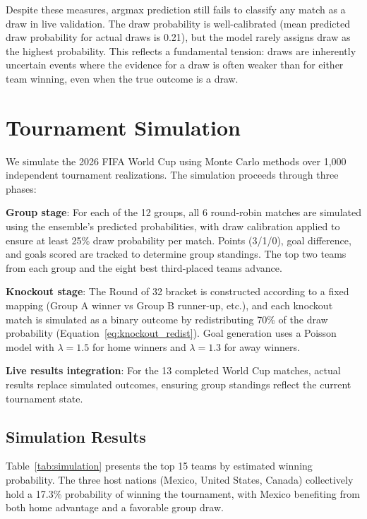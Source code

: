 \documentclass[11pt,a4paper]{article}
\begin{document}
Despite these measures, argmax prediction still fails to classify any match as a draw in live validation. The draw probability is well-calibrated (mean predicted draw probability for actual draws is 0.21), but the model rarely assigns draw as the highest probability. This reflects a fundamental tension: draws are inherently uncertain events where the evidence for a draw is often weaker than for either team winning, even when the true outcome is a draw.

\section{Tournament Simulation}
\label{sec:simulation}

We simulate the 2026 FIFA World Cup using Monte Carlo methods over 1,000 independent tournament realizations. The simulation proceeds through three phases:

\textbf{Group stage}: For each of the 12 groups, all 6 round-robin matches are simulated using the ensemble's predicted probabilities, with draw calibration applied to ensure at least 25\% draw probability per match. Points (3/1/0), goal difference, and goals scored are tracked to determine group standings. The top two teams from each group and the eight best third-placed teams advance.

\textbf{Knockout stage}: The Round of 32 bracket is constructed according to a fixed mapping (Group A winner vs Group B runner-up, etc.), and each knockout match is simulated as a binary outcome by redistributing 70\% of the draw probability (Equation~\ref{eq:knockout_redist}). Goal generation uses a Poisson model with $\lambda = 1.5$ for home winners and $\lambda = 1.3$ for away winners.

\textbf{Live results integration}: For the 13 completed World Cup matches, actual results replace simulated outcomes, ensuring group standings reflect the current tournament state.

\subsection{Simulation Results}
\label{sec:simulation:results}

Table~\ref{tab:simulation} presents the top 15 teams by estimated winning probability. The three host nations (Mexico, United States, Canada) collectively hold a 17.3\% probability of winning the tournament, with Mexico benefiting from both home advantage and a favorable group draw.
\end{document}
